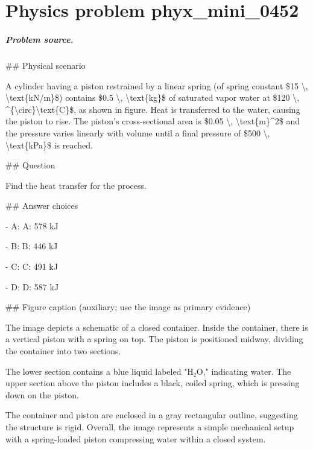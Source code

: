 
\chapter{Physics problem phyx\_mini\_0452}
\label{ch:PhyXMiniProblems_problem_phyx_mini_0452}

\paragraph{Problem source.}
\#\# Physical scenario

A cylinder having a piston restrained by a linear spring (of spring constant \$15 \textbackslash{}, \textbackslash{}text\{kN/m\}\$) contains \$0.5 \textbackslash{}, \textbackslash{}text\{kg\}\$ of saturated vapor water at \$120 \textbackslash{}, \textasciicircum{}\{\textbackslash{}circ\}\textbackslash{}text\{C\}\$, as shown in figure. Heat is transferred to the water, causing the piston to rise. The piston's cross-sectional area is \$0.05 \textbackslash{}, \textbackslash{}text\{m\}\textasciicircum{}2\$ and the pressure varies linearly with volume until a final pressure of \$500 \textbackslash{}, \textbackslash{}text\{kPa\}\$ is reached.

\#\# Question

Find the heat transfer for the process.

\#\# Answer choices

- A: A: 578 kJ

- B: B: 446 kJ

- C: C: 491 kJ

- D: D: 587 kJ

\#\# Figure caption (auxiliary; use the image as primary evidence)

The image depicts a schematic of a closed container. Inside the container, there is a vertical piston with a spring on top. The piston is positioned midway, dividing the container into two sections. 

The lower section contains a blue liquid labeled "H₂O," indicating water. The upper section above the piston includes a black, coiled spring, which is pressing down on the piston.

The container and piston are enclosed in a gray rectangular outline, suggesting the structure is rigid. Overall, the image represents a simple mechanical setup with a spring-loaded piston compressing water within a closed system.

